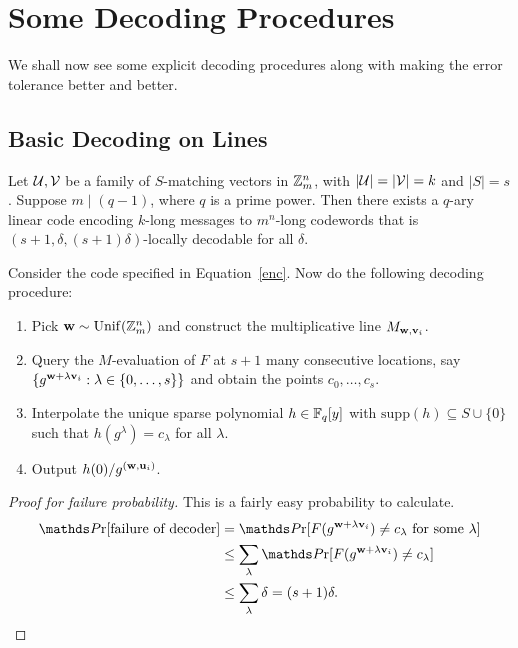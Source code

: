 \section{Some Decoding Procedures}

We shall now see some explicit decoding procedures along with making the error tolerance better and better.

\subsection{Basic Decoding on Lines}

\begin{greybox}
    \begin{proposition}
        \label{prop:line-decoding-mvc}
Let $\mathcal{U},\mathcal{V}$ be a family of $S$-matching vectors in $\mathbb{Z}_m^n$,
with $|\mathcal{U}| = |\mathcal{V}| = k$ and $|S| = s$. Suppose $m \mid (q-1)$, where
$q$ is a prime power. Then there exists a $q$-ary linear code encoding
$k$-long messages to $m^n$-long codewords that is
$(s+1,\delta,(s+1)\delta)$-locally decodable for all $\delta$.
\end{proposition}
\end{greybox}

Consider the code specified in Equation~\ref{enc}. Now do the following decoding procedure:
\begin{enumerate}
    \item Pick $\mathbf{w}\sim\mathrm{Unif}(\mathbb{Z}_m^n)$ and construct the multiplicative line $M_{\mathbf{w}, \mathbf{v}_i}$.
    \item Query the $M$-evaluation of $F$ at $s+1$ many consecutive locations, say $\{g^{\mathbf{w}+\lambda \mathbf{v}_i} : \lambda\in\{0,\ldots,s\}\}$ and obtain the points $c_0,\ldots,c_s$. 
    \item Interpolate the unique sparse polynomial $h\in\mathbb{F}_q[y]$ with $\mathrm{supp}(h)\subseteq S\cup\{0\}$ such that $h(g^{\lambda}) = c_{\lambda}$ for all $\lambda$.
    \item Output $h(0)/g^{(\mathbf{w}, \mathbf{u}_i)}$.
\end{enumerate}

\begin{proof}[Proof for failure probability] This is a fairly easy probability to calculate.
    \begin{align*}
        \Pr[\text{failure of decoder}] 
        & = \Pr[F(g^{\bfw + \lambda\bfv_i}) \neq c_{\lambda}\text{ for some $\lambda$}] \\
        & \leq \sum_{\lambda} \Pr[F(g^{\bfw + \lambda\bfv_i}) \neq c_{\lambda}]\\
        & \leq \sum_{\lambda}\delta = (s+1)\delta.
    \end{align*}
    
\end{proof}


